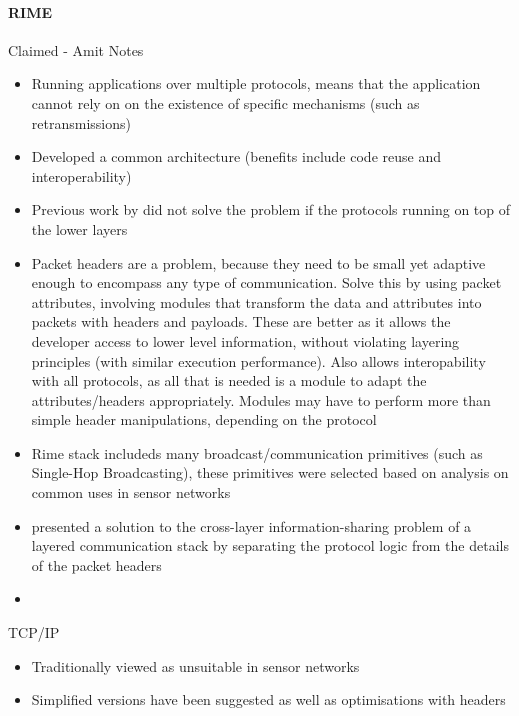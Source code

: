 \paragraph{RIME}
Claimed - Amit
\cite{Dunkels:2007:ACA:1322263.1322295} %
Notes
\begin{itemize}
	\item Running applications over multiple protocols, means that the application cannot rely on on the existence of specific mechanisms (such as retransmissions)
	\item Developed a common architecture (benefits include code reuse and interoperability)
	\item Previous work by \cite{Ee:2006:MNL:1298455.1298479,Polastre:2005:ULA:1098918.1098928} did not solve the problem if the protocols running on top of the lower layers 
	\item Packet headers are a problem, because they need to be small yet adaptive enough to encompass any type of communication. Solve this by using packet attributes, involving modules that transform the data and attributes into packets with headers and payloads. These are better as it allows the developer access to lower level information, without violating layering principles (with similar execution performance). Also allows interopability with all protocols, as all that is needed is a module to adapt the attributes/headers appropriately. Modules may have to perform more than simple header manipulations, depending on the protocol
	\item Rime stack includeds many broadcast/communication primitives (such as Single-Hop Broadcasting), these primitives were selected based on analysis on common uses in sensor networks
	\item presented a solution to the cross-layer information-sharing problem of a layered communication stack by separating the protocol logic from the details of the packet headers
	\item  
\end{itemize}

TCP/IP
\begin{itemize}
	\item Traditionally viewed as unsuitable in sensor networks
	\item Simplified versions have been suggested as well as optimisations with headers \cite{Dunkels:2003:FTA:1066116.1066118,Dunkels04makingtcp/ip} 
\end{itemize}


